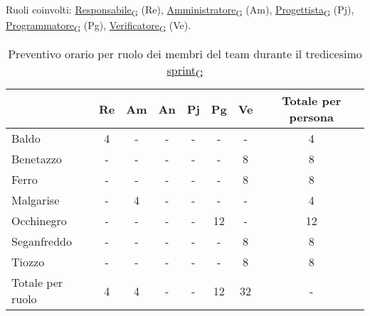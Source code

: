 \newpage
{}
Ruoli coinvolti: \href{https://7last.github.io/docs/rtb/documentazione-interna/glossario\#responsabile}{Responsabile\textsubscript{G}} (Re), \href{https://7last.github.io/docs/rtb/documentazione-interna/glossario\#amministratore}{Amministratore\textsubscript{G}} (Am), \href{https://7last.github.io/docs/rtb/documentazione-interna/glossario\#progettista}{Progettista\textsubscript{G}} (Pj), \href{https://7last.github.io/docs/rtb/documentazione-interna/glossario\#programmatore}{Programmatore\textsubscript{G}} (Pg), \href{https://7last.github.io/docs/rtb/documentazione-interna/glossario\#verificatore}{Verificatore\textsubscript{G}} (Ve).
\begin{table}[!h]
    \centering
    \begin{tabular}{ | l | c | c | c | c | c | c | c | }
        \hline
        \textbf{} & \textbf{Re} & \textbf{Am} &\textbf{An} & \textbf{Pj} & \textbf{Pg} & \textbf{Ve} & \textbf{Totale per persona} \\
        \hline
        Baldo            &  4   &  -   &  -   &  -   &  -   &  -   &  4   \\
        Benetazzo        &  -   &  -   &  -   &  -   &  -   &  8   &  8   \\
        Ferro            &  -   &  -   &  -   &  -   &  -   &  8   &  8   \\
        Malgarise        &  -   &  4   &  -   &  -   &  -   &  -   &  4   \\
        Occhinegro       &  -   &  -   &  -   &  -   & 12   &  -   & 12   \\
        Seganfreddo      &  -   &  -   &  -   &  -   &  -   &  8   &  8   \\
        Tiozzo           &  -   &  -   &  -   &  -   &  -   &  8   &  8   \\
        \hline
        Totale per ruolo &  4   &  4   &  -   &  -   & 12   & 32   &  -   \\
        \hline
    \end{tabular}
    \caption{Preventivo orario per ruolo dei membri del team durante il tredicesimo \href{https://7last.github.io/docs/rtb/documentazione-interna/glossario\#sprint}{sprint\textsubscript{G}}}
    
\end{table}

